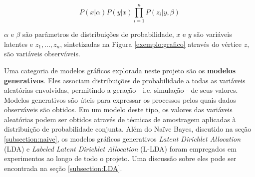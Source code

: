 \begin{equation}
\label{eq:fiction}
\ensuremath{P(x | \alpha)P(y | x)\prod_{i=1}^{n}P(z_i | y, \beta)} 
\end{equation}

\ensuremath{\alpha} e \ensuremath{\beta} são parâmetros de distribuições de probabilidade, \ensuremath{x} e \ensuremath{y} são variáveis latentes e \ensuremath{z_1, ..., z_n}, sintetizadas na Figura \ref{exemplo:grafico} através do vértice \ensuremath{z}, são variáveis observáveis.




 




Uma categoria de modelos gráficos explorada neste projeto são os \textbf{modelos generativos}. Eles associam distribuições de probabilidade a todas as variáveis aleatórias envolvidas, permitindo a geração - i.e. simulação - de seus valores. Modelos generativos são úteis para expressar os processos pelos quais dados observáveis são obtidos. Em um modelo deste tipo, os valores das variáveis aleatórias podem ser obtidos através de técnicas de amostragem aplicadas à distribuição de probabilidade conjunta. Além do Naïve Bayes, discutido na seção \ref{subsection:naive}, os modelos gráficos generativos \emph{Latent Dirichlet Allocation} (LDA) e \emph{Labeled Latent Dirichlet Allocation} (L-LDA) foram empregados em experimentos ao longo de todo o projeto. Uma discussão sobre eles pode ser encontrada na seção \ref{subsection:LDA}. %

